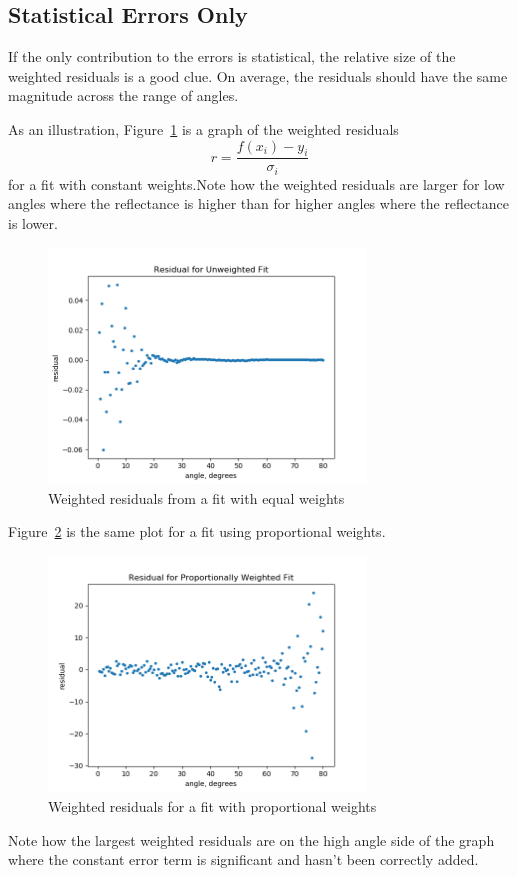 \documentclass[english]{scrartcl}
\begin{document}
\subsection{Statistical Errors Only}
If the only contribution to the errors is statistical,
the relative size of the weighted residuals is a good
clue. On average, the residuals should have the same
magnitude across the range of angles.

As an illustration, Figure~\ref{fig:res-equalweight}
is a graph of the weighted residuals
\begin{equation}
r=\frac{f(x_i)-y_i}{\sigma_i}
\end{equation}
for a fit with constant weights.Note how the weighted
residuals are larger for low angles where the reflectance
is higher than for higher angles where the reflectance
is lower.
\begin{figure}[htb]
  \begin{center}
    \includegraphics[width=0.75\textwidth]{images/res-equalweight}
  \end{center}
  \caption{\label{fig:res-equalweight}Weighted residuals
  from a fit with equal weights}
\end{figure}

Figure~\ref{fig:res-propweight} is the same plot for a fit
using proportional weights.
\begin{figure}[htb]
  \begin{center}
    \includegraphics[width=0.75\textwidth]{images/res-propweight}
  \end{center}
  \caption{\label{fig:res-propweight}Weighted residuals
  for a fit with proportional weights}
\end{figure}
Note how the largest weighted residuals are on the high
angle side of the graph where the constant error term
is significant and hasn't been correctly added.
\end{document}
